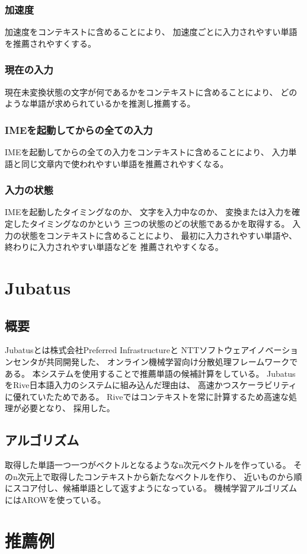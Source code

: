 \subsubsection{加速度}
加速度をコンテキストに含めることにより、
加速度ごとに入力されやすい単語を推薦されやすくする。

\subsubsection{現在の入力}
現在未変換状態の文字が何であるかをコンテキストに含めることにより、
どのような単語が求められているかを推測し推薦する。

\subsubsection{IMEを起動してからの全ての入力}
IMEを起動してからの全ての入力をコンテキストに含めることにより、
入力単語と同じ文章内で使われやすい単語を推薦されやすくなる。

\subsubsection{入力の状態}
IMEを起動したタイミングなのか、
文字を入力中なのか、
変換または入力を確定したタイミングなのかという
三つの状態のどの状態であるかを取得する。
入力の状態をコンテキストに含めることにより、
最初に入力されやすい単語や、終わりに入力されやすい単語などを
推薦されやすくなる。

\section{Jubatus}
\label{sec:jubatus}

\subsection{概要}
Jubatus\cite{jubatus}とは株式会社Preferred Infrastructureと
NTTソフトウェアイノベーションセンタが共同開発した、
オンライン機械学習向け分散処理フレームワークである。
本システムを使用することで推薦単語の候補計算をしている。
JubatusをRive日本語入力のシステムに組み込んだ理由は、
高速かつスケーラビリティに優れていたためである。
Riveではコンテキストを常に計算するため高速な処理が必要となり、
採用した。

\subsection{アルゴリズム}
取得した単語一つ一つがベクトルとなるようなn次元ベクトルを作っている。
そのn次元上で取得したコンテキストから新たなベクトルを作り、
近いものから順にスコア付し、候補単語として返すようになっている。
機械学習アルゴリズムにはAROW\cite{AROW}を使っている。

\section{推薦例}

